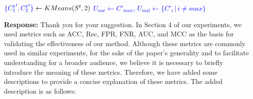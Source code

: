 \documentclass[a4paper,twoside,11pt,dvipsnames]{reviewresponse}
\begin{document}
\begin{algorithm}
\begin{algorithmic}[1]
{} 
\State $\textcolor{blue}{\{{C^t_1}', {C^t_2}'\}} \gets KMeans(S^t, 2)$ 
\State \textcolor{blue}{$U_{nor} \gets C'_{max}$, $U_{mal} \gets \{C'_i \, | \, i \neq max\}$}

\end{algorithmic}
\end{algorithm}



\textbf{Response:} Thank you for your suggestion. In Section 4 of our experiments, we used metrics such as ACC, Rec, FPR, FNR, AUC, and MCC as the basis for validating the effectiveness of our method. Although these metrics are commonly used in similar experiments, for the sake of the paper's generality and to facilitate understanding for a broader audience, we believe it is necessary to briefly introduce the meaning of these metrics. Therefore, we have added some descriptions to provide a concise explanation of these metrics. The added description is as follows:
\end{document}
